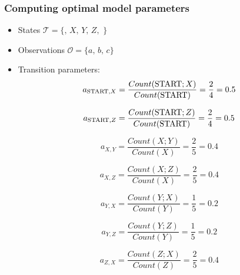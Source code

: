 \documentclass[9pt,twocolumn]{article}
\newcommand{\START}{\text{\lstinline{START}}}
\newcommand{\STOP}{\text{\lstinline{STOP}}}
\begin{document}
        \subsubsection*{Computing optimal model parameters}
            \begin{itemize}
                \item
                    States $\mathcal{T} = \{$\START$,\,X,\,Y,\,Z,$ \STOP$\}$
                \item
                    Observations $\mathcal{O} = \{a,\,b,\,c\}$
                \item
                    Transition parameters:
                    \begin{equation}
                        a_{\START,X} = \dfrac{Count(\START;X)}{Count(\START)} = \dfrac{2}{4} = 0.5
                    \end{equation}

                    \begin{equation}
                        a_{\START,Z} = \dfrac{Count(\START;Z)}{Count(\START)} = \dfrac{2}{4} = 0.5
                    \end{equation}

                    \begin{equation}
                        a_{X,Y} = \dfrac{Count(X;Y)}{Count(X)} = \dfrac{2}{5} = 0.4
                    \end{equation}

                    \begin{equation}
                        a_{X,Z} = \dfrac{Count(X;Z)}{Count(X)} = \dfrac{2}{5} = 0.4
                    \end{equation}

                    \begin{equation}
                        a_{Y,X} = \dfrac{Count(Y;X)}{Count(Y)} = \dfrac{1}{5} = 0.2
                    \end{equation}

                    \begin{equation}
                        a_{Y,Z} = \dfrac{Count(Y;Z)}{Count(Y)} = \dfrac{1}{5} = 0.2
                    \end{equation}

                    \begin{equation}
                        a_{Z,X} = \dfrac{Count(Z;X)}{Count(Z)} = \dfrac{2}{5} = 0.4
                    \end{equation}


\end{itemize}
\end{document}
